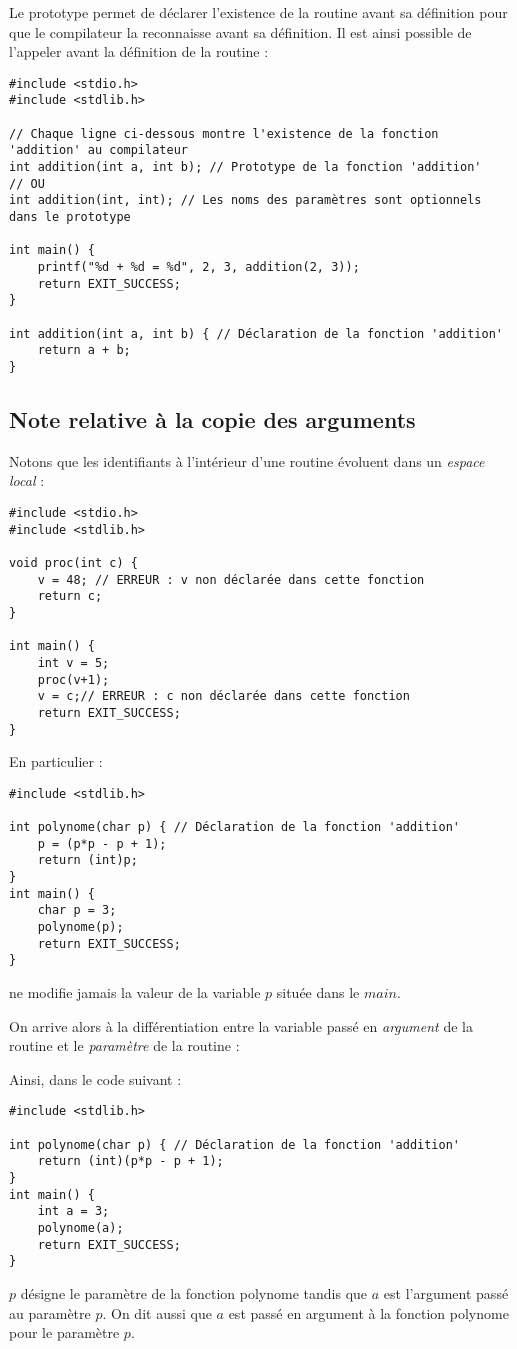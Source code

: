 \documentclass[../../../main.tex]{subfiles}
\begin{document}
Le prototype permet de déclarer l'existence de la routine avant sa définition pour que le compilateur la reconnaisse avant sa définition. Il est ainsi possible de l'appeler avant la définition de la routine :
\begin{verbatim}
#include <stdio.h>
#include <stdlib.h>

// Chaque ligne ci-dessous montre l'existence de la fonction 'addition' au compilateur
int addition(int a, int b); // Prototype de la fonction 'addition'
// OU
int addition(int, int); // Les noms des paramètres sont optionnels dans le prototype

int main() {
	printf("%d + %d = %d", 2, 3, addition(2, 3));
	return EXIT_SUCCESS;
}

int addition(int a, int b) { // Déclaration de la fonction 'addition'
	return a + b;
}
\end{verbatim}
\subsection{Note relative à la copie des arguments}
\label{sub:note_relative_la_copie_des_arguments}
Notons que les identifiants à l'intérieur d'une routine évoluent dans un \textit{espace local} :
\begin{verbatim}
#include <stdio.h>
#include <stdlib.h>

void proc(int c) {
	v = 48; // ERREUR : v non déclarée dans cette fonction
	return c;
}

int main() {
	int v = 5;
	proc(v+1);
	v = c;// ERREUR : c non déclarée dans cette fonction
	return EXIT_SUCCESS;
}
\end{verbatim}
En particulier :
\begin{verbatim}
#include <stdlib.h>

int polynome(char p) { // Déclaration de la fonction 'addition'
	p = (p*p - p + 1);
	return (int)p;
}
int main() {
	char p = 3;
	polynome(p);
	return EXIT_SUCCESS;
}
\end{verbatim}
ne modifie jamais la valeur de la variable $p$ située dans le $main$.
 
On arrive alors à la différentiation entre la variable passé en \textit{argument} de la routine et le \textit{paramètre} de la routine :  

Ainsi, dans le code suivant :
\begin{verbatim}
#include <stdlib.h>

int polynome(char p) { // Déclaration de la fonction 'addition'
	return (int)(p*p - p + 1);
}
int main() {
	int a = 3;
	polynome(a);
	return EXIT_SUCCESS;
}
\end{verbatim}
$p$ désigne le paramètre de la fonction \textsf{polynome} tandis que $a$ est l'argument passé au paramètre $p$. On dit aussi que $a$ est passé en argument à la fonction \textsf{polynome} pour le paramètre $p$.
 
\end{document}
